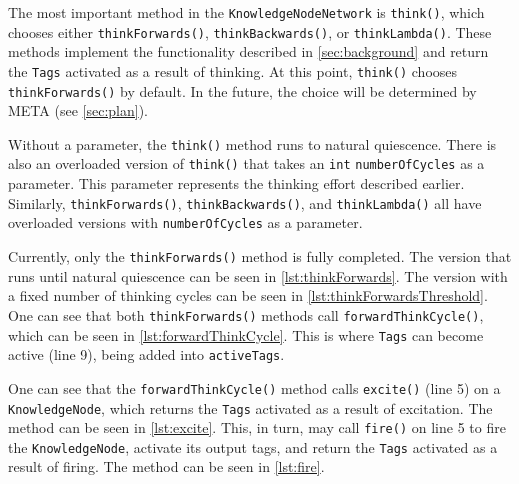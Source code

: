 \documentclass[titlepage,11pt]{article}
\def \knnpath {"C:/Users/Sean/IdeaProjects/Prometheus/src/knn/KnowledgeNodeNetwork.java"}
\newcommand{\ar}[1]{\autoref{#1}}
\newcommand{\code}[1]{\texttt{#1}}
\begin{document}
The most important method in the \code{KnowledgeNodeNetwork} is \code{think()}, which chooses either \code{thinkForwards()}, \code{thinkBackwards()}, or \code{thinkLambda()}. These methods implement the functionality described in \ar{sec:background} and return the \code{Tags} activated as a result of thinking. At this point, \code{think()} chooses \code{thinkForwards()} by default. In the future, the choice will be determined by META (see \autoref{sec:plan}).

Without a parameter, the \code{think()} method runs to natural quiescence. There is also an overloaded version of \code{think()} that takes an \code{int} \code{numberOfCycles} as a parameter. This parameter represents the thinking effort described earlier. Similarly, \code{thinkForwards()}, \code{thinkBackwards()}, and \code{thinkLambda()} all have overloaded versions with \code{numberOfCycles} as a parameter.





Currently, only the \code{thinkForwards()} method is fully completed. The version that runs until natural quiescence can be seen in \autoref{lst:thinkForwards}. The version with a fixed number of thinking cycles can be seen in \autoref{lst:thinkForwardsThreshold}. One can see that both \code{thinkForwards()} methods call \code{forwardThinkCycle()}, which can be seen in \autoref{lst:forwardThinkCycle}. This is where \code{Tags} can become active (line 9), being added into \code{activeTags}.



One can see that the \code{forwardThinkCycle()} method calls \code{excite()} (line 5) on a \code{KnowledgeNode}, which returns the \code{Tags} activated as a result of excitation. The method can be seen in \autoref{lst:excite}. This, in turn, may call \code{fire()} on line 5 to fire the \code{KnowledgeNode}, activate its output tags, and return the \code{Tags} activated as a result of firing. The method can be seen in \autoref{lst:fire}.


\end{document}
